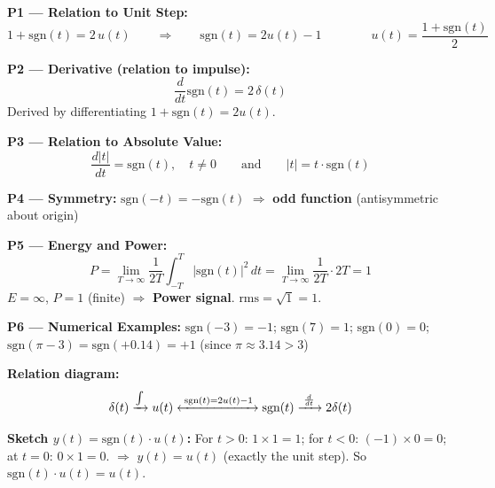 \documentclass[10pt,a4paper]{article}
\begin{document}
\begin{center}
\end{center}

\begin{propbox}
\textbf{P1 --- Relation to Unit Step:}
\[
  1 + \text{sgn}(t) = 2\,u(t) \qquad\Rightarrow\qquad \boxed{\text{sgn}(t) = 2u(t)-1} \qquad\qquad \boxed{u(t) = \frac{1+\text{sgn}(t)}{2}}
\]

\medskip
\textbf{P2 --- Derivative (relation to impulse):}
\[
  \frac{d}{dt}\text{sgn}(t) = 2\,\delta(t)
\]
Derived by differentiating $1+\text{sgn}(t)=2u(t)$.

\medskip
\textbf{P3 --- Relation to Absolute Value:}
\[
  \frac{d|t|}{dt} = \text{sgn}(t), \quad t\neq0 \qquad\text{and}\qquad |t| = t\cdot\text{sgn}(t)
\]

\medskip
\textbf{P4 --- Symmetry:}
$\text{sgn}(-t) = -\text{sgn}(t)$ $\Rightarrow$ \textbf{odd function} (antisymmetric about origin)

\medskip
\textbf{P5 --- Energy and Power:}
\[
  P = \lim_{T\to\infty}\frac{1}{2T}\int_{-T}^{T}|\text{sgn}(t)|^2\,dt = \lim_{T\to\infty}\frac{1}{2T}\cdot 2T = 1
\]
$E=\infty$, $P=1$ (finite) $\Rightarrow$ \textbf{Power signal}. \quad $\text{rms} = \sqrt{1} = 1$.

\medskip
\textbf{P6 --- Numerical Examples:}
$\text{sgn}(-3) = -1$; \quad
$\text{sgn}(7) = 1$; \quad
$\text{sgn}(0) = 0$; \quad
$\text{sgn}(\pi-3) = \text{sgn}(+0.14) = +1$ (since $\pi\approx3.14>3$)
\end{propbox}

\begin{exbox}
\textbf{Relation diagram:}
\[
  \delta(t)\xrightarrow{\int} u(t)\xleftrightarrow{\;\text{sgn}(t)=2u(t)-1\;}\text{sgn}(t)\xrightarrow{\;\frac{d}{dt}\;} 2\delta(t)
\]

\textbf{Sketch $y(t) = \text{sgn}(t)\cdot u(t)$:}
For $t>0$: $1\times1=1$; for $t<0$: $(-1)\times 0=0$; at $t=0$: $0\times1=0$.
$\Rightarrow$ $y(t)=u(t)$ (exactly the unit step). So $\text{sgn}(t)\cdot u(t)=u(t)$.
\end{exbox}
\end{document}
